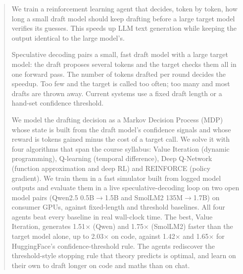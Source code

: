 \begin{abstract}
We train a reinforcement learning agent that decides, token by token, how long a small draft model should keep drafting before a large target model verifies its guesses. This speeds up LLM text generation while keeping the output identical to the large model's.

Speculative decoding pairs a small, fast draft model with a large target model: the draft proposes several tokens and the target checks them all in one forward pass. The number of tokens drafted per round decides the speedup. Too few and the target is called too often; too many and most drafts are thrown away. Current systems use a fixed draft length or a hand-set confidence threshold.

We model the drafting decision as a Markov Decision Process (MDP) whose state is built from the draft model's confidence signals and whose reward is tokens gained minus the cost of a target call. We solve it with four algorithms that span the course syllabus: Value Iteration (dynamic programming), Q-learning (temporal difference), Deep Q-Network (function approximation and deep RL) and REINFORCE (policy gradient). We train them in a fast simulator built from logged model outputs and evaluate them in a live speculative-decoding loop on two open model pairs (Qwen2.5 0.5B$\to$1.5B and SmolLM2 135M$\to$1.7B) on consumer GPUs, against fixed-length and threshold baselines. All four agents beat every baseline in real wall-clock time. The best, Value Iteration, generates
1.51$\times$ (Qwen) and 1.75$\times$ (SmolLM2) faster than the target model alone, up to 2.03$\times$ on code,
against 1.42$\times$ and 1.65$\times$ for HuggingFace's confidence-threshold rule. The agents rediscover the
threshold-style stopping rule that theory predicts is optimal, and learn on their own to draft longer on code
and maths than on chat.
\end{abstract}
